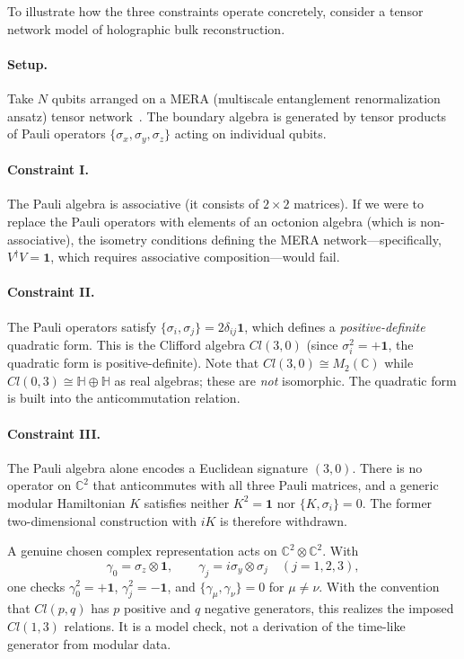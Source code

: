 \documentclass[12pt,a4paper,openany]{book}
\begin{document}
To illustrate how the three constraints operate concretely, consider a tensor network model of holographic bulk reconstruction.

\paragraph{Setup.}
Take $N$ qubits arranged on a MERA (multiscale entanglement renormalization ansatz) tensor network~\cite{Swingle2012,Vidal2008}.
The boundary algebra is generated by tensor products of Pauli operators $\{\sigma_x, \sigma_y, \sigma_z\}$ acting on individual qubits.

\paragraph{Constraint I.}
The Pauli algebra is associative (it consists of $2 \times 2$ matrices).
If we were to replace the Pauli operators with elements of an octonion algebra (which is non-associative), the isometry conditions defining the MERA network---specifically, $V^\dagger V = \mathbf{1}$, which requires associative composition---would fail.

\paragraph{Constraint II.}
The Pauli operators satisfy $\{\sigma_i, \sigma_j\} = 2\delta_{ij}\mathbf{1}$, which defines a \emph{positive-definite} quadratic form.
This is the Clifford algebra $Cl(3,0)$ (since $\sigma_i^2 = +\mathbf{1}$, the quadratic form is positive-definite).
Note that $Cl(3,0) \cong M_2(\mathbb{C})$ while $Cl(0,3) \cong \mathbb{H} \oplus \mathbb{H}$ as real algebras; these are \emph{not} isomorphic.
The quadratic form is built into the anticommutation relation.

\paragraph{Constraint III.}
The Pauli algebra alone encodes a Euclidean signature $(3,0)$.
There is no operator on $\mathbb C^2$ that anticommutes with all three Pauli matrices, and a generic modular Hamiltonian $K$ satisfies neither $K^2=\mathbf1$ nor $\{K,\sigma_i\}=0$.  The former two-dimensional construction with $iK$ is therefore withdrawn.

A genuine chosen complex representation acts on $\mathbb C^2\otimes\mathbb C^2$.  With
\begin{equation}
\gamma_0=\sigma_z\otimes\mathbf1,\qquad
\gamma_j=i\sigma_y\otimes\sigma_j\quad(j=1,2,3),
\end{equation}
one checks $\gamma_0^2=+\mathbf1$, $\gamma_j^2=-\mathbf1$, and $\{\gamma_\mu,\gamma_\nu\}=0$ for $\mu\ne\nu$.  With the convention that $Cl(p,q)$ has $p$ positive and $q$ negative generators, this realizes the imposed $Cl(1,3)$ relations.  It is a model check, not a derivation of the time-like generator from modular data.
\end{document}
